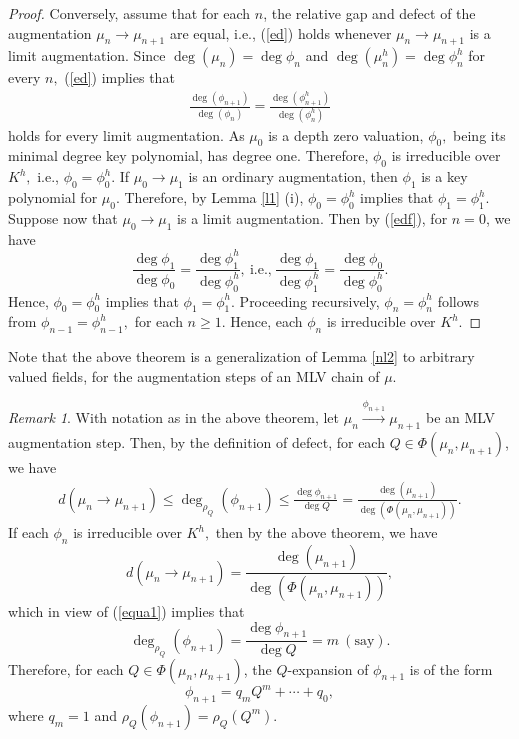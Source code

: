 \documentclass[11pt]{amsart}
\theoremstyle{definition}
\theoremstyle{remark}
\newtheorem{remark}[theorem]{Remark}
\numberwithin{equation}{section}
\begin{document}
\begin{proof}
		Conversely, assume that for each $n$, the relative gap and defect of the augmentation $\mu_n\longrightarrow \mu_{n+1}$ are equal, i.e., (\ref{ed}) holds whenever $\mu_n\longrightarrow \mu_{n+1}$ is a limit augmentation. Since $\deg(\mu_n)=\deg \phi_n$ and $\deg(\mu_n^h)=\deg \phi_n^h$ for every $n,$ (\ref{ed}) implies that
		\begin{align}\label{edf}
			\frac{\deg(\phi_{n+1})}{\deg(\phi_n)}=\frac{\deg(\phi_{n+1}^h)}{\deg(\phi_n^h)}
			\end{align} holds for every limit augmentation.
		 As $\mu_0$ is a depth zero valuation, $\phi_0,$ being its minimal degree key polynomial, has degree one. Therefore, $\phi_0$ is irreducible over $K^h,$ i.e., $\phi_0=\phi_0^h.$ If $\mu_0\longrightarrow \mu_1$ is an ordinary augmentation, then $\phi_1$ is a key polynomial for $\mu_0.$ Therefore, by Lemma \ref{l1} (i), $\phi_0=\phi_0^h$ implies that $\phi_1=\phi_1^h.$ Suppose now that $\mu_0\longrightarrow \mu_1$ is a limit augmentation. Then by (\ref{edf}), for $n=0$, we have
		  \[\frac{\deg\phi_1}{\deg\phi_0}=\frac{\deg\phi_1^h}{\deg\phi_0^h},\
		\text{i.e.,}\ \frac{\deg\phi_1}{\deg\phi_1^h}=\frac{\deg\phi_0}{\deg\phi_0^h}. 
		\]
		Hence,  $\phi_0=\phi_0^h$ implies that $\phi_1=\phi_1^h.$ Proceeding recursively, $\phi_{n}=\phi_{n}^h$ follows from $\phi_{n-1}=\phi_{n-1}^h,$  for each $n\geq1.$ Hence, each $\phi_n$ is irreducible over $K^h.$
		\end{proof}
		
		Note that the above theorem is a generalization of Lemma \ref{nl2} to arbitrary valued fields, for the augmentation steps of an MLV chain of $\mu$.
		\begin{remark}\label{r2}
		With notation as in the above theorem, let $\mu_n\xrightarrow{\phi_{n+1}} \mu_{n+1}$ be an MLV augmentation step. Then, by the definition of defect, for each $Q\in\Phi(\mu_n,\mu_{n+1})$, we have
		\begin{align}\label{equa1}
			d(\mu_n\longrightarrow \mu_{n+1})\leq \deg_{\rho_Q}(\phi_{n+1})\leq \frac{\deg\phi_{n+1}}{\deg Q}=\frac{\deg(\mu_{n+1})}{\deg(\Phi(\mu_n,\mu_{n+1}))}.\end{align} If each $\phi_n$ is irreducible over $K^h,$ then by the above theorem, we have \[d(\mu_n\longrightarrow \mu_{n+1})=\frac{\deg(\mu_{n+1})}{\deg(\Phi(\mu_n,\mu_{n+1}))},\] which in view of (\ref{equa1}) implies that \[\deg_{\rho_Q}(\phi_{n+1})= \frac{\deg\phi_{n+1}}{\deg Q}=m \ (\text{say}).\] Therefore, 
		for each $Q\in\Phi(\mu_n,\mu_{n+1})$, the $Q$-expansion of $\phi_{n+1}$ is of the form \[\phi_{n+1}=q_m{Q}^m+\cdots+q_0,\]  where $q_m=1$ and $\rho_Q(\phi_{n+1})=\rho_Q({Q}^m).$
			\end{remark}
	
\end{document}
